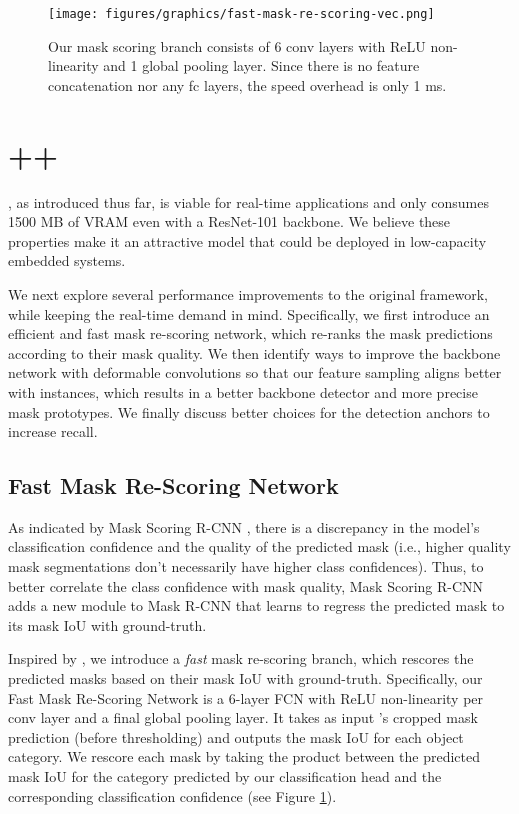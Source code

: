 \documentclass[10pt,journal,compsoc]{IEEEtran}
\begin{document}
\begin{figure}
    \centering
    
\texttt{[image: figures/graphics/fast-mask-re-scoring-vec.png]}


    \caption{ Our mask scoring branch consists of 6 conv layers with ReLU non-linearity and 1 global pooling layer.  Since there is no feature concatenation nor any fc layers, the speed overhead is only 1 ms.}
\label{fig:mask_score}
\end{figure} \section{\methodname++}\label{sec:yolact++}
\methodname{}, as introduced thus far, is viable for real-time applications and only consumes 1500 MB of VRAM even with a ResNet-101 backbone.  We believe these properties make it an attractive model that could be deployed in low-capacity embedded systems. 

We next explore several performance improvements to the original framework, while keeping the real-time demand in mind.  Specifically, we first introduce an efficient and fast mask re-scoring network, which re-ranks the mask predictions according to their mask quality.  We then identify ways to improve the backbone network with deformable convolutions so that our feature sampling aligns better with instances, which results in a better backbone detector and more precise mask prototypes. We finally discuss better choices for the detection anchors to increase recall.



\subsection{Fast Mask Re-Scoring Network}
As indicated by Mask Scoring R-CNN \cite{huang-msrcnn2018}, there is a discrepancy in the model's classification confidence and the quality of the predicted mask (i.e., higher quality mask segmentations don't necessarily have higher class confidences).  Thus, to better correlate the class confidence with mask quality, Mask Scoring R-CNN adds a new module to Mask R-CNN that learns to regress the predicted mask to its mask IoU with ground-truth.   

Inspired by \cite{huang-msrcnn2018}, we introduce a \emph{fast} mask re-scoring branch, which rescores the predicted masks based on their mask IoU with ground-truth.  Specifically, our Fast Mask Re-Scoring Network is a 6-layer FCN with ReLU non-linearity per conv layer and a final global pooling layer.  It takes as input \methodname{}'s cropped mask prediction (before thresholding) and outputs the mask IoU for each object category. We rescore each mask by taking the product between the predicted mask IoU for the category predicted by our classification head and the corresponding classification confidence (see Figure \ref{fig:mask_score}). 
\end{document}
